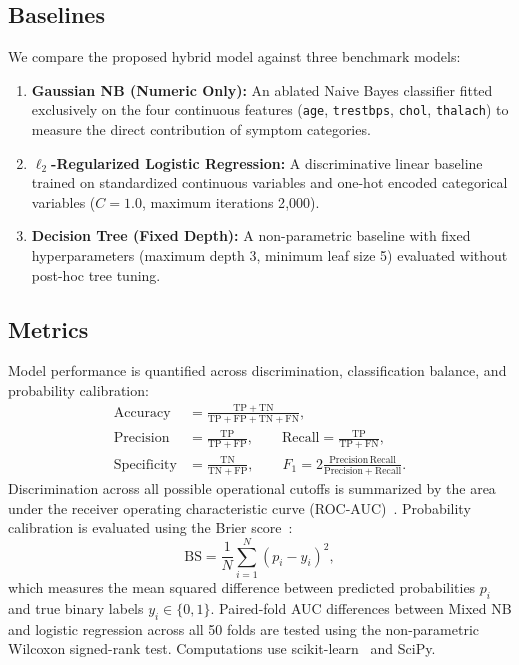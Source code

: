 \documentclass[conference]{IEEEtran}
\begin{document}
\subsection{Baselines}
We compare the proposed hybrid model against three benchmark models:
\begin{enumerate}
\item \textbf{Gaussian NB (Numeric Only):} An ablated Naive Bayes classifier fitted exclusively on the four continuous features (\texttt{age}, \texttt{trestbps}, \texttt{chol}, \texttt{thalach}) to measure the direct contribution of symptom categories.
\item \textbf{$\ell_2$-Regularized Logistic Regression:} A discriminative linear baseline trained on standardized continuous variables and one-hot encoded categorical variables ($C=1.0$, maximum iterations 2{,}000).
\item \textbf{Decision Tree (Fixed Depth):} A non-parametric baseline with fixed hyperparameters (maximum depth 3, minimum leaf size 5) evaluated without post-hoc tree tuning.
\end{enumerate}

\subsection{Metrics}
Model performance is quantified across discrimination, classification balance, and probability calibration:
\begin{align}
\mathrm{Accuracy}&=\frac{\mathrm{TP}+\mathrm{TN}}{\mathrm{TP}+\mathrm{FP}+\mathrm{TN}+\mathrm{FN}},\\
\mathrm{Precision}&=\frac{\mathrm{TP}}{\mathrm{TP}+\mathrm{FP}},\qquad
\mathrm{Recall}=\frac{\mathrm{TP}}{\mathrm{TP}+\mathrm{FN}},\\
\mathrm{Specificity}&=\frac{\mathrm{TN}}{\mathrm{TN}+\mathrm{FP}},\qquad
F_1=2\frac{\mathrm{Precision}\,\mathrm{Recall}}{\mathrm{Precision}+\mathrm{Recall}}.
\end{align}
Discrimination across all possible operational cutoffs is summarized by the area under the receiver operating characteristic curve (ROC-AUC)~\cite{fawcett2006}. Probability calibration is evaluated using the Brier score~\cite{brier1950}:
\begin{equation}
\mathrm{BS} = \frac{1}{N}\sum_{i=1}^{N} (p_i - y_i)^2,
\end{equation}
which measures the mean squared difference between predicted probabilities $p_i$ and true binary labels $y_i\in\{0,1\}$. Paired-fold AUC differences between Mixed NB and logistic regression across all 50 folds are tested using the non-parametric Wilcoxon signed-rank test. Computations use scikit-learn~\cite{sklearn} and SciPy.
\end{document}
